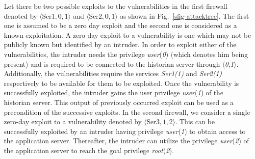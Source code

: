 Let there be two possible exploits to the vulnerabilities in the first firewall denoted by $\langle\textrm{Ser}1,0,1\rangle$ and $\langle\textrm{Ser}2,0,1\rangle$ as shown in Fig.~\ref{sfig-attacktree}. The first one is assumed to be a zero day exploit and the second one is considered as a known exploitation. A zero day exploit to a vulnerability is one which may not be publicly known but identified by an intruder. In order to exploit either of the vulnerabilities, the intruder needs the privilege \emph{user}(\emph{0}) (which denotes him being present) and is required to be connected to the historian server through $\langle$\emph{0},\emph{1}$\rangle$. Additionally, the vulnerabilities require the services \emph{Ser1(1)} and \emph{Ser2(1)} respectively to be available for them to be exploited. Once the vulnerability is successfully exploited, the intruder gains the user privilege \emph{user}(\emph{1}) of the historian server. This output of previously occurred exploit can be used as a precondition of the successive exploits. In the second firewall, we consider a single zero-day exploit to a vulnerability denoted by $\langle\textrm{Ser}3,1,2\rangle$. This can be successfully exploited by an intruder having privilege \emph{user}(\emph{1}) to obtain access to the application server. Thereafter, the intruder can utilize the privilege \emph{user}(\emph{2}) of the application server to reach the goal privilege \emph{root}(\emph{2}).

